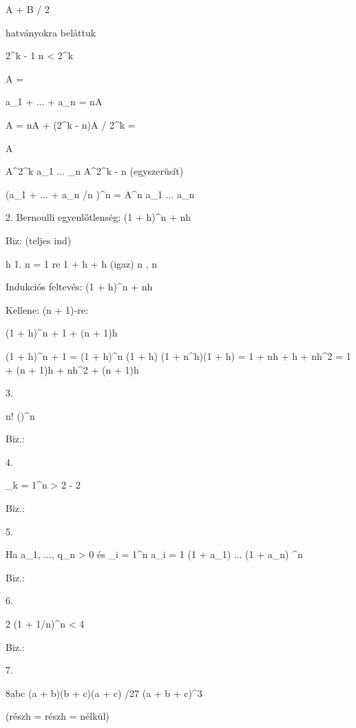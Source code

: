 A + B / 2 \geq {}

 hatványokra beláttuk

2^{k - 1}  n < 2^k

A = 

a_1 + ... + a_n = nA




A = nA + (2^k - n)A /  2^k =  \geq {}

A \geq {}


A^{2^k} \geq a_1 \cdot ... \a_n \cdot A^{2^k - n} (egyszerüsít)

(a_1 + ... + a_n  /n )^n = A^n \geq a_1 \cdot ... \cdot a_n

2. Bernoulli egyenlőtlenség:
(1 + h)^n  + nh

Biz: (teljes ind)

h 
1. n = 1 re 1 + h  + h (igaz)
n \in {}, n 

Indukciós feltevés:
(1 + h)^n  + nh

Kellene: (n + 1)-re:

(1 + h)^{n + 1}  + (n + 1)h

(1 + h)^{n + 1} = (1 + h)^n \cdot (1 + h) \geq (1 + n^h)(1 + h) =
1 + nh + h + nh^2 = 1 + (n + 1)h + nh^2  + (n + 1)h

3.

n! \leq ()^n

Biz.:

4.

\sum_{k = 1}^n  > 2  - 2

Biz.:

5.

Ha a_1, ..., q_n > 0 és \sqrt_{i = 1}^n a_i = 1 \Rightarrow (1 + a_1) \cdot ... \cdot (1 + a_n) ^n

Biz.:

6.

2 \leq (1 + 1/n)^n < 4

Biz.:

7.

8abc \geq (a + b)(b + c)(a + c) /27 (a + b + c)^3


(részh = részh = nélkül)
